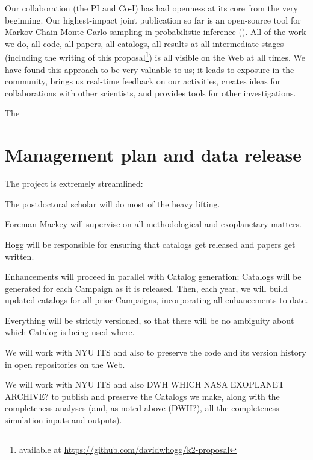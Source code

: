 \documentclass[12pt,preprint]{aastex}
\begin{document}
Our collaboration (the PI and Co-I) has had openness at its core from
the very beginning.
Our highest-impact joint publication so far is an open-source tool for
Markov Chain Monte Carlo sampling in probabilistic inference (\citealt{emcee}).
All of the work we do, all code, all papers, all catalogs, all results
at all intermediate stages (including the writing of this
proposal\footnote{available at
  \url{https://github.com/davidwhogg/k2-proposal}}) is all visible on
the Web at all times.
We have found this approach to be very valuable to us; it leads to
exposure in the community, brings us real-time feedback on our
activities, creates ideas for collaborations with other scientists,
and provides tools for other investigations.

The 

\section{Management plan and data release}

The project is extremely streamlined:

The postdoctoral scholar will do most of the heavy lifting.

Foreman-Mackey will supervise on all methodological and exoplanetary
matters.

Hogg will be responsible for ensuring that catalogs get released and
papers get written.

Enhancements will proceed in parallel with Catalog generation;
Catalogs will be generated for each Campaign as it is released.
Then, each year, we will build updated catalogs for all prior
Campaigns, incorporating all enhancements to date.

Everything will be strictly versioned, so that there will be no
ambiguity about which Catalog is being used where.

We will work with NYU ITS and also  to preserve
the code and its version history in open repositories on the Web.

We will work with NYU ITS and also DWH WHICH NASA EXOPLANET ARCHIVE?
to publish and preserve the Catalogs we make, along with the
completeness analyses (and, as noted above (DWH?), all the
completeness simulation inputs and outputs).
\end{document}
